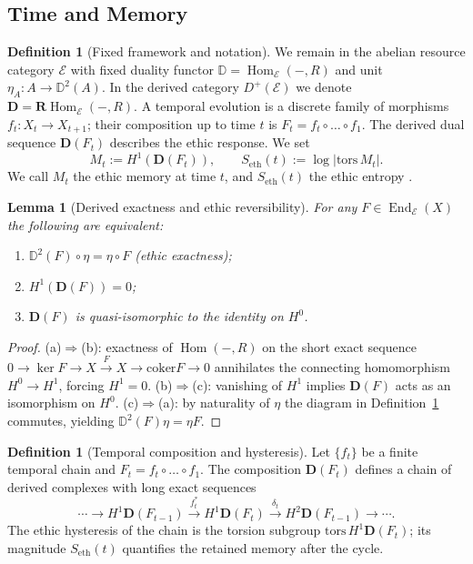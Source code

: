 \documentclass[12pt]{article}
\newcommand{\E}{\mathcal{E}}
\newcommand{\DD}{\mathbb{D}}
\newcommand{\Hom}{\operatorname{Hom}}
\newcommand{\End}{\operatorname{End}}
\newcommand{\RHom}{\mathbf{R}\!\operatorname{Hom}}
\newcommand{\Dplus}{D^{+}}
\theoremstyle{plain}
\newtheorem{lemma}[theorem]{Lemma}
\theoremstyle{definition}
\newtheorem{definition}[theorem]{Definition}
\theoremstyle{remark}
\numberwithin{equation}{section}
\begin{document}
\subsection{Time and Memory}\label{subsec:kontsevich-hysteresis}

\begin{definition}[Fixed framework and notation]
We remain in the abelian resource category $\E$ with fixed duality functor $\mathbb D=\Hom_{\E}(-,R)$ and unit $\eta_A:A\to\DD^2(A)$. In the derived category $\Dplus(\E)$ we denote $\mathbf D=\RHom_{\E}(-,R)$. 
A temporal evolution is a discrete family of morphisms $f_t:X_t\to X_{t+1}$; their composition up to time $t$ is $F_t=f_t\circ\dots\circ f_1$. 
The derived dual sequence $\mathbf D(F_t)$ describes the ethic response. 
We set 
\[
M_t:=H^1(\mathbf D(F_t)),\qquad S_{\mathrm{eth}}(t):=\log|\mathrm{tors}\,M_t|.
\]
We call $M_t$ the ethic memory at time $t$, and $S_{\mathrm{eth}}(t)$ the ethic entropy \cite{Weibel1994,GelfandManin2003}.
\end{definition}

\begin{lemma}[Derived exactness and ethic reversibility]\label{lem:derived-exactness}
For any $F\in\End_\E(X)$ the following are equivalent:
\begin{enumerate}[label=(\alph*)]
\item $\DD^2(F)\circ\eta=\eta\circ F$ (ethic exactness);
\item $H^1(\mathbf D(F))=0$;
\item $\mathbf D(F)$ is quasi-isomorphic to the identity on $H^0$.
\end{enumerate}
\end{lemma}

\begin{proof}
(a)$\Rightarrow$(b): exactness of $\Hom(-,R)$ on the short exact sequence $0\to\ker F\to X\xrightarrow{F}X\to\mathrm{coker}F\to 0$ annihilates the connecting homomorphism $H^0\to H^1$, forcing $H^1=0$.  
(b)$\Rightarrow$(c): vanishing of $H^1$ implies $\mathbf D(F)$ acts as an isomorphism on $H^0$.  
(c)$\Rightarrow$(a): by naturality of $\eta$ the diagram in Definition~\ref{lem:derived-exactness} commutes, yielding $\DD^2(F)\eta=\eta F$.  
\end{proof}

\begin{definition}[Temporal composition and hysteresis]
Let $\{f_t\}$ be a finite temporal chain and $F_t=f_t\circ\dots\circ f_1$. 
The composition $\mathbf D(F_t)$ defines a chain of derived complexes with long exact sequences
\[
\cdots\to H^1\mathbf D(F_{t-1})\xrightarrow{f_t^\ast} H^1\mathbf D(F_t)\xrightarrow{\delta_t} H^2\mathbf D(F_{t-1})\to\cdots.
\]
The ethic hysteresis of the chain is the torsion subgroup $\mathrm{tors}\,H^1\mathbf D(F_t)$; its magnitude $S_{\mathrm{eth}}(t)$ quantifies the retained memory after the cycle.
\end{definition}
\end{document}
